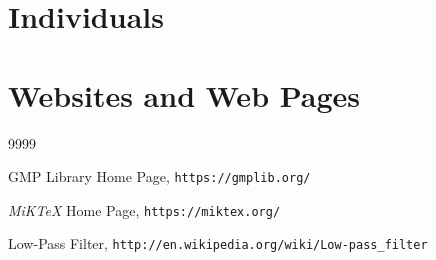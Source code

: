 \section*{Individuals}



\section*{Websites and Web Pages}

\begin{thecustombibliography}{9999}

GMP Library Home Page,
\texttt{https://gmplib.org/}

\emph{MiK\TeX{}} Home Page,
\texttt{https://miktex.org/}

Low-Pass Filter,
\texttt{http://en.wikipedia.org/wiki/Low-pass\_filter}

\end{thecustombibliography}

